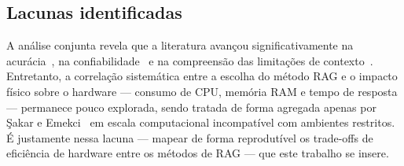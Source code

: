 \subsection{Lacunas identificadas}

A análise conjunta revela que a literatura avançou significativamente na acurácia~\cite{ma2023query, rackauckas2024ragfusion}, na confiabilidade~\cite{andriopoulos2023augmenting, barnett2024seven} e na compreensão das limitações de contexto~\cite{liu2023lost, nair2023drilling}. Entretanto, a correlação sistemática entre a escolha do método RAG e o impacto físico sobre o hardware --- consumo de CPU, memória RAM e tempo de resposta --- permanece pouco explorada, sendo tratada de forma agregada apenas por Şakar e Emekci~\cite{sakar2025rag} em escala computacional incompatível com ambientes restritos. É justamente nessa lacuna --- mapear de forma reprodutível os trade-offs de eficiência de hardware entre os métodos de RAG --- que este trabalho se insere.

